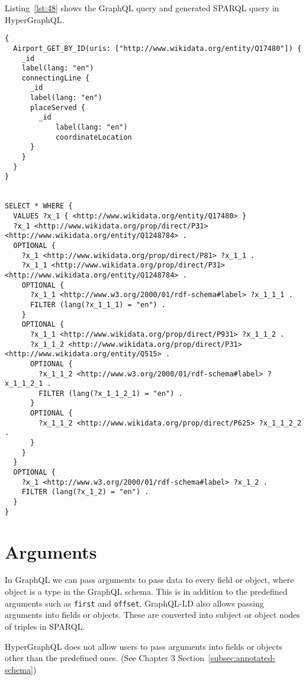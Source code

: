 Listing~\ref{lst:48} shows the GraphQL query and generated SPARQL query in HyperGraphQL. 

\begin{minipage}{\linewidth}
\begin{lstlisting}[columns=fullflexible, label=lst:48, caption={GraphQL query and generated SPARQL query in HyperGraphQL}, language=SPARQL]
{
  Airport_GET_BY_ID(uris: ["http://www.wikidata.org/entity/Q17480"]) {
    _id
    label(lang: "en")
    connectingLine {
      _id
      label(lang: "en")
      placeServed {
        _id
        	label(lang: "en")
        	coordinateLocation
      }
    }
  }
} 


SELECT * WHERE {
  VALUES ?x_1 { <http://www.wikidata.org/entity/Q17480> }
  ?x_1 <http://www.wikidata.org/prop/direct/P31> <http://www.wikidata.org/entity/Q1248784> .
  OPTIONAL {
    ?x_1 <http://www.wikidata.org/prop/direct/P81> ?x_1_1 .
    ?x_1_1 <http://www.wikidata.org/prop/direct/P31> <http://www.wikidata.org/entity/Q1248784> .
    OPTIONAL {
      ?x_1_1 <http://www.w3.org/2000/01/rdf-schema#label> ?x_1_1_1 .
      FILTER (lang(?x_1_1_1) = "en") .
    }
    OPTIONAL {
      ?x_1_1 <http://www.wikidata.org/prop/direct/P931> ?x_1_1_2 .
      ?x_1_1_2 <http://www.wikidata.org/prop/direct/P31> <http://www.wikidata.org/entity/Q515> .
      OPTIONAL {
        ?x_1_1_2 <http://www.w3.org/2000/01/rdf-schema#label> ?x_1_1_2_1 .
        FILTER (lang(?x_1_1_2_1) = "en") .
      }
      OPTIONAL {
        ?x_1_1_2 <http://www.wikidata.org/prop/direct/P625> ?x_1_1_2_2 .
      }
    }
  }
  OPTIONAL {
    ?x_1 <http://www.w3.org/2000/01/rdf-schema#label> ?x_1_2 .
    FILTER (lang(?x_1_2) = "en") .
  }
}
\end{lstlisting}
\end{minipage}

\section{Arguments}

In GraphQL we can pass arguments to pass data to every field or object, where object is a type in the GraphQL schema. This is in addition to the predefined arguments such as \texttt{first} and \texttt{offset}. GraphQL-LD also allows passing arguments into fields or objects. These are converted into subject or object nodes of triples in SPARQL.

HyperGraphQL does not allow users to pass arguments into fields or objects other than the predefined ones. (See Chapter 3 Section~\ref{subsec:annotated-schema})

